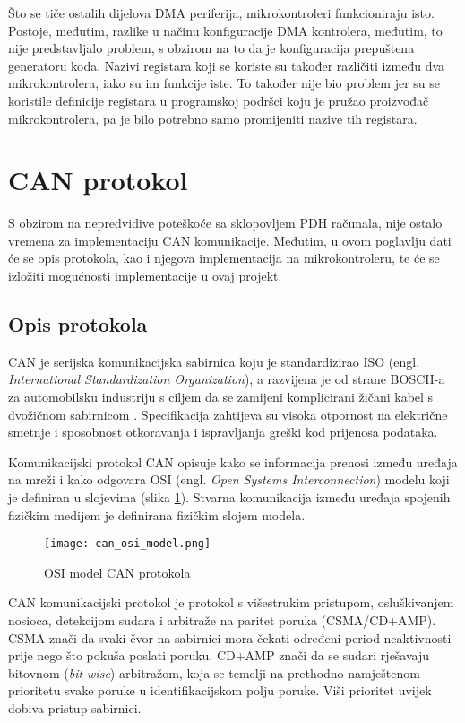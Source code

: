 Što se tiče ostalih dijelova DMA periferija, mikrokontroleri funkcioniraju isto. Postoje, međutim, razlike u načinu konfiguracije DMA kontrolera, međutim, to nije predstavljalo problem, s obzirom na to da je konfiguracija prepuštena generatoru koda. Nazivi registara koji se koriste su također različiti između dva mikrokontrolera, iako su im funkcije iste. To također nije bio problem jer su se koristile definicije registara u programskoj podršci koju je pružao proizvođač mikrokontrolera, pa je bilo potrebno samo promijeniti nazive tih registara.

\section{CAN protokol}

S obzirom na nepredvidive poteškoće sa sklopovljem PDH računala, nije ostalo vremena za implementaciju CAN komunikacije. Međutim, u ovom poglavlju dati će se opis protokola, kao i njegova implementacija na mikrokontroleru, te će se izložiti mogućnosti implementacije u ovaj projekt.

\subsection{Opis protokola}

CAN je serijska komunikacijska sabirnica koju je standardizirao ISO (engl. \textit{International Standardization Organization}), a razvijena je od strane BOSCH-a za automobilsku industriju s ciljem da se zamijeni komplicirani žičani kabel s dvožičnom sabirnicom \cite{can_manual}. Specifikacija zahtijeva su visoka otpornost na električne smetnje i sposobnost otkoravanja i ispravljanja greški kod prijenosa podataka.

Komunikacijski protokol CAN opisuje kako se informacija prenosi između uređaja na mreži i kako odgovara OSI (engl. \textit{Open Systems Interconnection}) modelu koji je definiran u slojevima (slika \ref{fig:can_osi_model}). Stvarna komunikacija između uređaja spojenih fizičkim medijem je definirana fizičkim slojem modela.

\begin{figure}[H]
	\centering
	\texttt{[image: can\_osi\_model.png]}
	\caption{OSI model CAN protokola \cite[str. 2]{can_manual}}
	\label{fig:can_osi_model}
\end{figure}

CAN komunikacijski protokol je protokol s višestrukim pristupom, osluškivanjem nosioca, detekcijom sudara i arbitraže na paritet poruka (CSMA/CD+AMP). CSMA znači da svaki čvor na sabirnici mora čekati određeni period neaktivnosti prije nego što pokuša poslati poruku. CD+AMP znači da se sudari rješavaju bitovnom (\textit{bit-wise}) arbitražom, koja se temelji na prethodno namještenom prioritetu svake poruke u identifikacijskom polju poruke. Viši prioritet uvijek dobiva pristup sabirnici.

